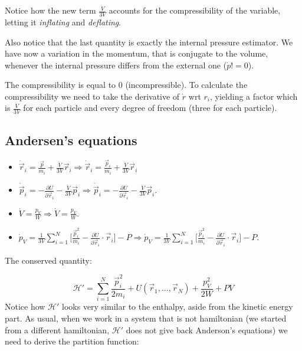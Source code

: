 Notice how the new term $ \frac{\dot{V}}{3V}$ accounts for the compressibility of the variable, letting it \textit{inflating} and \textit{deflating}.

Also notice that the last quantity is exactly the internal pressure estimator. We have now a variation in the momentum, that is conjugate to the volume, whenever the internal pressure differs from the external one ($\dot{p} != 0$).

The compressibility is equal to $0$ (incompressible).
To calculate the compressibility we need to take the derivative of $\dot{r}$ wrt $r_i$, yielding a factor which is $\frac{\dot{V}}{3V}$ for each particle and every degree of freedom (three for each particle). 

	\subsection{Andersen's equations}

	\begin{multicols}{2}
		\begin{itemize}
			\item $\dot{\vec{r}}_i = \frac{\vec{p}}{m_i} + \frac{\dot{V}}{3V}\vec{r}_i\Rightarrow\dot{\vec{r}}_i = \frac{\vec{p}_i}{m_i} + \frac{\dot{V}}{3V}\vec{r}_i$
			\item $\dot{\vec{p}}_i = -\frac{\partial U}{\partial\vec{r}_i} -\frac{\dot{V}}{3V}\vec{p}_i\Rightarrow \dot{\vec{p}}_i = -\frac{\partial U}{\partial\vec{r}_i}-\frac{\dot{V}}{3V}\vec{p}_i$.
			\item $\dot{V} = \frac{p_V}{W}\Rightarrow\dot{V} = \frac{p_V}{W}$.
			\item $\dot{p}_V = \frac{1}{3V}\sum\limits_{i=1}^N\biggl[\frac{\vec{p}_i^2}{m_i}-\frac{\partial U}{\partial\vec{r}_i}\cdot\vec{r}_i\biggr]-P\Rightarrow\dot{p}_V = \frac{1}{3V}\sum\limits_{i=1}^N\biggl[\frac{\vec{p}_i^2}{m_i}-\frac{\partial U}{\partial\vec{r}_i}\cdot\vec{r}_i\biggr]-P$.
		\end{itemize}
	\end{multicols}

	The conserved quantity:

	$$\mathcal{H}' = \sum\limits_{i=1}^N\frac{\vec{p}_i^2}{2m_i} + U(\vec{r}_1, \dots, \vec{r}_N) + \frac{p_V^2}{2W}+PV$$
	Notice how $\mathcal{H}'$ looks very similar to the enthalpy, aside from the kinetic energy part. 
	As usual, when we work in a system that is not hamiltonian (we started from a different hamiltonian, $\mathcal{H}'$ does not give back Anderson's equations) we need to derive the partition function:


